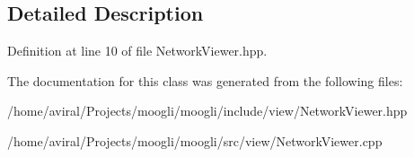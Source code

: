 \subsection{Detailed Description}


Definition at line 10 of file Network\-Viewer.\-hpp.



The documentation for this class was generated from the following files\-:\begin{DoxyCompactItemize}
\item 
/home/aviral/\-Projects/moogli/moogli/include/view/Network\-Viewer.\-hpp\item 
/home/aviral/\-Projects/moogli/moogli/src/view/Network\-Viewer.\-cpp\end{DoxyCompactItemize}
